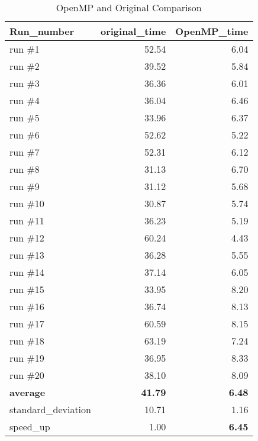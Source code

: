 \documentclass{article}
\begin{document}
\begin{table}[h]
    \caption{OpenMP and Original Comparison}
    \label{tab:comparison}
    \centering
    \begin{tabular}{lrr}
        \toprule
        Run\_number         & original\_time & OpenMP\_time  \\
        \midrule
        run \#1             & 52.54          & 6.04          \\
        run \#2             & 39.52          & 5.84          \\
        run \#3             & 36.36          & 6.01          \\
        run \#4             & 36.04          & 6.46          \\
        run \#5             & 33.96          & 6.37          \\
        run \#6             & 52.62          & 5.22          \\
        run \#7             & 52.31          & 6.12          \\
        run \#8             & 31.13          & 6.70          \\
        run \#9             & 31.12          & 5.68          \\
        run \#10            & 30.87          & 5.74          \\
        run \#11            & 36.23          & 5.19          \\
        run \#12            & 60.24          & 4.43          \\
        run \#13            & 36.28          & 5.55          \\
        run \#14            & 37.14          & 6.05          \\
        run \#15            & 33.95          & 8.20          \\
        run \#16            & 36.74          & 8.13          \\
        run \#17            & 60.59          & 8.15          \\
        run \#18            & 63.19          & 7.24          \\
        run \#19            & 36.95          & 8.33          \\
        run \#20            & 38.10          & 8.09          \\
        \textbf{average}    & \textbf{41.79} & \textbf{6.48} \\
        standard\_deviation & 10.71          & 1.16          \\
        speed\_up           & 1.00           & \textbf{6.45} \\
        \bottomrule
    \end{tabular}
\end{table}
\end{document}
